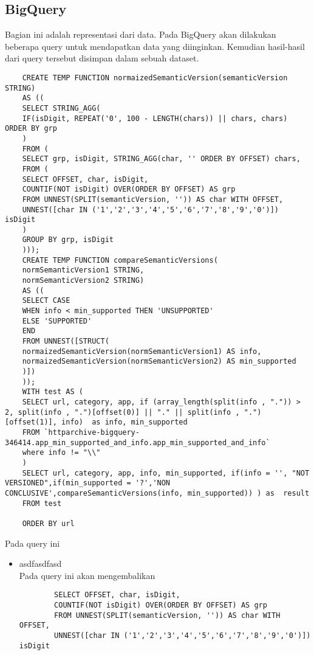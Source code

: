 \subsection{BigQuery}
Bagian ini adalah representasi dari data. Pada BigQuery akan dilakukan beberapa query untuk mendapatkan data yang diinginkan. Kemudian hasil-hasil dari query tersebut disimpan dalam sebuah dataset.
\begin{lstlisting}
	CREATE TEMP FUNCTION normaizedSemanticVersion(semanticVersion STRING) 
	AS ((
	SELECT STRING_AGG(
	IF(isDigit, REPEAT('0', 100 - LENGTH(chars)) || chars, chars) ORDER BY grp 
	)
	FROM (
	SELECT grp, isDigit, STRING_AGG(char, '' ORDER BY OFFSET) chars,
	FROM (
	SELECT OFFSET, char, isDigit,
	COUNTIF(NOT isDigit) OVER(ORDER BY OFFSET) AS grp
	FROM UNNEST(SPLIT(semanticVersion, '')) AS char WITH OFFSET, 
	UNNEST([char IN ('1','2','3','4','5','6','7','8','9','0')]) isDigit
	)
	GROUP BY grp, isDigit
	)));
	CREATE TEMP FUNCTION compareSemanticVersions(
	normSemanticVersion1 STRING, 
	normSemanticVersion2 STRING) 
	AS ((
	SELECT CASE 
	WHEN info < min_supported THEN 'UNSUPPORTED'
	ELSE 'SUPPORTED'
	END
	FROM UNNEST([STRUCT(
	normaizedSemanticVersion(normSemanticVersion1) AS info, 
	normaizedSemanticVersion(normSemanticVersion2) AS min_supported
	)])
	));
	WITH test AS (
	SELECT url, category, app, if (array_length(split(info , ".")) > 2, split(info , ".")[offset(0)] || "." || split(info , ".")[offset(1)], info)  as info, min_supported	
	FROM `httparchive-bigquery-346414.app_min_supported_and_info.app_min_supported_and_info`
	where info != "\\"
	)
	SELECT url, category, app, info, min_supported, if(info = '', "NOT VERSIONED",if(min_supported = '?','NON CONCLUSIVE',compareSemanticVersions(info, min_supported)) ) as  result
	FROM test 
	
	ORDER BY url
\end{lstlisting}

Pada query ini 
\begin{itemize}
	\item  asdfasdfasd\\
	Pada query ini akan mengembalikan 
	\begin{lstlisting}
		SELECT OFFSET, char, isDigit,
		COUNTIF(NOT isDigit) OVER(ORDER BY OFFSET) AS grp
		FROM UNNEST(SPLIT(semanticVersion, '')) AS char WITH OFFSET, 
		UNNEST([char IN ('1','2','3','4','5','6','7','8','9','0')]) isDigit
	\end{lstlisting}
	
	
\end{itemize}


